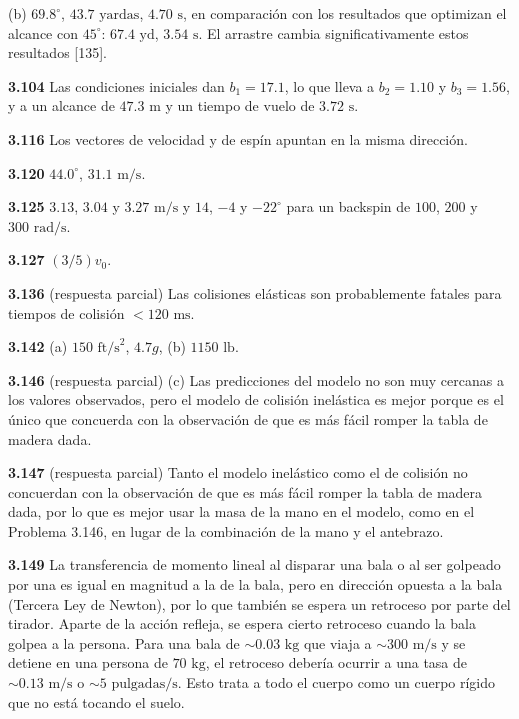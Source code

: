 \documentclass[12pt,a4paper]{book}
\begin{document}
(b) $69.8^\circ$, $43.7\text{ yardas}$, $4.70\text{ s}$, en comparación con los resultados que optimizan el alcance con $45^\circ$: $67.4\text{ yd}$, $3.54\text{ s}$. El arrastre cambia significativamente estos resultados [135].

\noindent \textbf{3.104} Las condiciones iniciales dan $b_1 = 17.1$, lo que lleva a $b_2 = 1.10$ y $b_3 = 1.56$, y a un alcance de $47.3\text{ m}$ y un tiempo de vuelo de $3.72\text{ s}$.

\noindent \textbf{3.116} Los vectores de velocidad y de espín apuntan en la misma dirección.

\noindent \textbf{3.120} $44.0^\circ$, $31.1\text{ m/s}$.

\noindent \textbf{3.125} $3.13$, $3.04$ y $3.27\text{ m/s}$ y $14$, $-4$ y $-22^\circ$ para un backspin de $100$, $200$ y $300\text{ rad/s}$.

\noindent \textbf{3.127} $(3/5)v_0$.

\noindent \textbf{3.136} (respuesta parcial) Las colisiones elásticas son probablemente fatales para tiempos de colisión $<120\text{ ms}$.

\noindent \textbf{3.142} (a) $150\text{ ft/s}^2$, $4.7g$, (b) $1150\text{ lb}$.

\noindent \textbf{3.146} (respuesta parcial) (c) Las predicciones del modelo no son muy cercanas a los valores observados, pero el modelo de colisión inelástica es mejor porque es el único que concuerda con la observación de que es más fácil romper la tabla de madera dada.

\noindent \textbf{3.147} (respuesta parcial) Tanto el modelo inelástico como el de colisión no concuerdan con la observación de que es más fácil romper la tabla de madera dada, por lo que es mejor usar la masa de la mano en el modelo, como en el Problema 3.146, en lugar de la combinación de la mano y el antebrazo.

\noindent \textbf{3.149} La transferencia de momento lineal al disparar una bala o al ser golpeado por una es igual en magnitud a la de la bala, pero en dirección opuesta a la bala (Tercera Ley de Newton), por lo que también se espera un retroceso por parte del tirador. Aparte de la acción refleja, se espera cierto retroceso cuando la bala golpea a la persona. Para una bala de $\sim 0.03\text{ kg}$ que viaja a $\sim 300\text{ m/s}$ y se detiene en una persona de $70\text{ kg}$, el retroceso debería ocurrir a una tasa de $\sim 0.13\text{ m/s}$ o $\sim 5\text{ pulgadas/s}$. Esto trata a todo el cuerpo como un cuerpo rígido que no está tocando el suelo.
\end{document}

